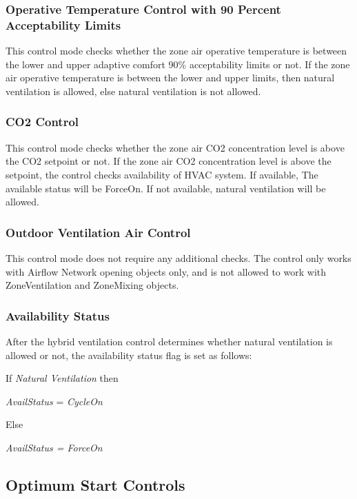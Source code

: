 \subsubsection{Operative Temperature Control with 90 Percent Acceptability Limits}\label{operative-temperature-control-with-90-acceptability-limits}

 This control mode checks whether the zone air operative temperature is between the lower and upper adaptive comfort 90\% acceptability limits or not. If the zone air operative temperature is between the lower and upper limits, then natural ventilation is allowed, else natural ventilation is not allowed. 

\subsubsection{CO2 Control}\label{co2-control} 

 This control mode checks whether the zone air CO2 concentration level is above the CO2 setpoint or not. If the zone air CO2 concentration level is above the setpoint, the control checks availability of HVAC system. If available, The available status will be ForceOn. If not available, natural ventilation will be allowed. 

\subsubsection{Outdoor Ventilation Air Control}\label{outdoor-ventilation-air-control}

This control mode does not require any additional checks. The control only works with Airflow Network opening objects only, and is not allowed to work with ZoneVentilation and ZoneMixing objects.

\subsubsection{Availability Status}\label{availability-status}

After the hybrid ventilation control determines whether natural ventilation is allowed or not, the availability status flag is set as follows:

If \emph{Natural Ventilation} then

\emph{AvailStatus} = \emph{CycleOn}

Else

\emph{AvailStatus = ForceOn}

\subsection{Optimum Start Controls}\label{optimum-start-controls}

